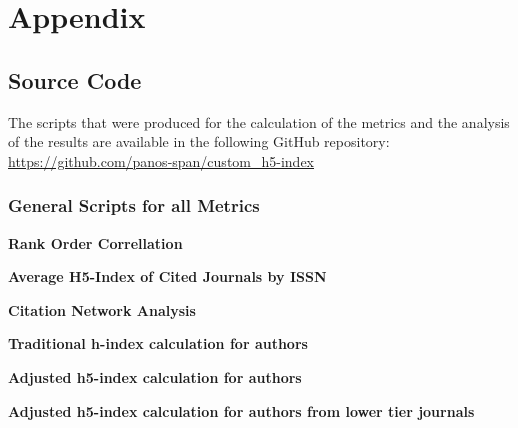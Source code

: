 \chapter{Appendix}
\label{ch:appendix}

\section{Source Code}

The scripts that were produced for the calculation of the metrics and the
analysis of the results are available in the following GitHub repository:
\url{
    https://github.com/panos-span/custom_h5-index
}

\subsection{General Scripts for all Metrics}

\textbf{Rank Order Correllation}




\textbf{Average H5-Index of Cited Journals by ISSN}




\textbf{Citation Network Analysis}





\textbf{Traditional h-index calculation for authors}





\textbf{Adjusted h5-index calculation for authors}





\textbf{Adjusted h5-index calculation for authors from lower tier journals}





